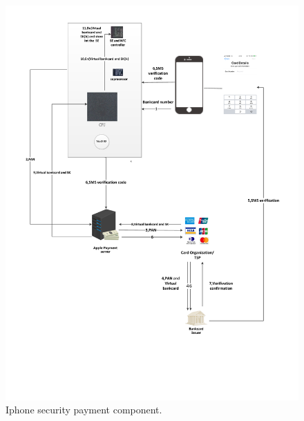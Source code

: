 \documentclass[journal]{IEEEtran}
\begin{document}
\begin{figure}[htbp]
\centerline{\includegraphics[scale=0.37]{iphone_tsp.pdf}}
\caption{Iphone security payment component.}
\label{fig}
\end{figure}
\end{document}
